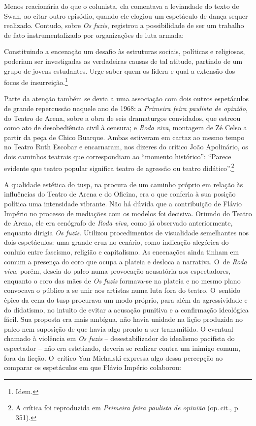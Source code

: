 Menos reacionária do que o colunista, ela comentava a leviandade do
texto de Swan, ao citar outro episódio, quando ele elogiou um
espetáculo de dança sequer realizado. Contudo, sobre {\it Os fuzis},
registrou a possibilidade de ser um trabalho de fato instrumentalizado
por organizações de luta armada:

\startblockquote
Constituindo a encenação um desafio às estruturas sociais, políticas e
religiosas, poderiam ser investigadas as verdadeiras causas de tal
atitude, partindo de um grupo de jovens estudantes. Urge saber quem os
lidera e qual a extensão dos focos de insurreição.\footnote{Idem.}
\stopblockquote

Parte da atenção também se devia a uma associação com dois outros
espetáculos de grande repercussão naquele ano de 1968: a {\it Primeira
feira paulista de opinião}, do Teatro de Arena, sobre a obra de seis
dramaturgos convidados, que estreou como ato de desobediência civil à
censura; e {\it Roda viva}, montagem de Zé Celso a partir da peça de
Chico Buarque. Ambas estiveram em cartaz ao mesmo tempo no Teatro Ruth
Escobar e encarnaram, nos dizeres do crítico João Apolinário, os dois
caminhos teatrais que correspondiam ao “momento histórico”: “Parece
evidente que teatro popular significa teatro de agressão ou teatro
didático”.\footnote{A crítica foi reproduzida em
  {\it Primeira feira paulista de opinião} (op.\,cit., p.\,351).}

A qualidade estética do {\sc tusp}, na procura de um caminho próprio em
relação às influências do Teatro de Arena e do Oficina, era o que
conferia à sua posição política uma intensidade vibrante. Não há dúvida
que a contribuição de Flávio Império no processo de mediações com os
modelos foi decisiva. Oriundo do Teatro de Arena, ele era cenógrafo de
{\it Roda viva}, como já observado anteriormente, enquanto dirigia {\it Os
fuzis}. Utilizou procedimentos de visualidade semelhantes nos dois
espetáculos: uma grande cruz no cenário, como indicação alegórica do
conluio entre fascismo, religião e capitalismo. As encenações ainda
tinham em comum a presença do coro que ocupa a plateia e desloca a
narrativa. O~de {\it Roda viva}, porém, descia do palco numa provocação
acusatória aos espectadores, enquanto o coro das mães de {\it Os fuzis}
formava-se na plateia e no mesmo plano convocava o público a se unir aos
artistas numa luta fora do teatro. O~sentido épico da cena do {\sc tusp}
procurava um modo próprio, para além da agressividade e do didatismo, no
intuito de evitar a acusação punitiva e a confirmação ideológica fácil.
Sua proposta era mais ambígua, não havia unidade na lição produzida no
palco nem suposição de que havia algo pronto a ser transmitido. O
eventual chamado à violência em {\it Os fuzis} -- desestabilizador do
idealismo pacifista do espectador -- não era estetizado, deveria se
realizar contra um inimigo comum, fora da ficção. O~crítico Yan
Michalski expressa algo dessa percepção ao comparar os espetáculos em
que Flávio Império colaborou:

